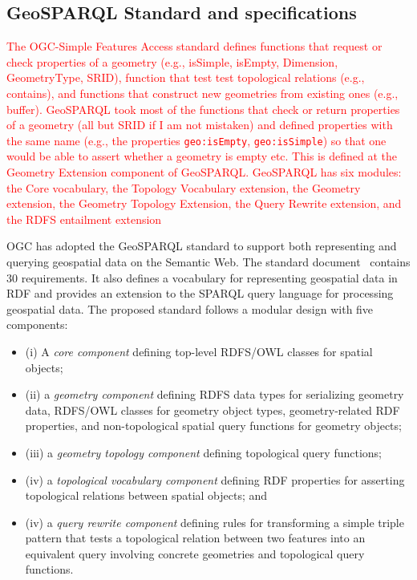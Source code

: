 \subsection{GeoSPARQL Standard and specifications}
\textcolor{red}{The OGC-Simple Features Access standard defines functions that request or 
check properties of a geometry (e.g., isSimple, isEmpty, Dimension, GeometryType, SRID), function that test test topological relations (e.g., contains),
and functions that construct new geometries from existing ones (e.g., buffer). 
GeoSPARQL took most of the functions that check or return properties of  
a geometry (all but SRID if I am not mistaken) and defined properties with the 
same name (e.g., the properties \texttt{geo:isEmpty}, \texttt{geo:isSimple}) so that one would 
be able to assert whether a geometry is empty etc. This is defined at the
Geometry Extension component of GeoSPARQL.
GeoSPARQL has six modules: the Core vocabulary, the Topology Vocabulary extension, the Geometry extension, the Geometry Topology Extension, the Query Rewrite extension, and the RDFS entailment extension}

OGC has adopted the GeoSPARQL standard to support both representing and querying geospatial data on the Semantic Web. The standard document~\cite{ogc2012} contains 30 requirements. It also defines a vocabulary for representing geospatial data in RDF and provides an extension to the SPARQL query language for processing geospatial data. The proposed standard follows a modular design with five components: 
\begin{itemize}
\item (i) A \textit{core component} defining top-level RDFS/OWL classes for spatial objects; 
\item (ii) a \textit{geometry component} defining RDFS data types for serializing geometry data, RDFS/OWL classes for geometry object types, geometry-related RDF properties, and non-topological spatial query functions for geometry objects; 
\item (iii) a \textit{geometry topology component} defining topological query functions; 
\item (iv) a \textit{topological vocabulary component} defining RDF properties for asserting topological relations between spatial objects; and 
\item (iv) a \textit{query rewrite component} defining rules for transforming a simple triple pattern that tests a topological relation between two features into an equivalent query involving concrete geometries and topological query functions.
\end{itemize}

